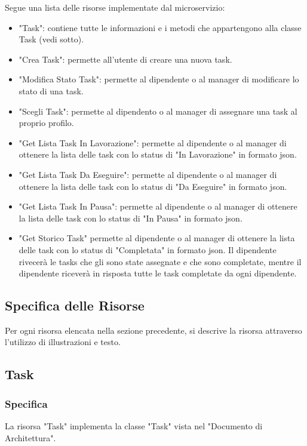 \documentclass{report}
\begin{document}
Segue una lista delle risorse implementate dal microservizio:
\begin{itemize}
	\item "Task": contiene tutte le informazioni e i metodi che appartengono alla classe Task (vedi sotto).
	\item "Crea Task": permette all'utente di creare una nuova task.
	\item "Modifica Stato Task": permette al dipendente o al manager di modificare lo stato di una task.
	\item "Scegli Task": permette al dipendento o al manager di assegnare una task al proprio profilo.
	\item "Get Lista Task In Lavorazione": permette al dipendente o al manager di ottenere la lista delle task con lo status di "In Lavorazione" in formato json.
	\item "Get Lista Task Da Eseguire": permette al dipendente o al manager di ottenere la lista delle task con lo status di "Da Eseguire" in formato json.
	\item "Get Lista Task In Pausa": permette al dipendente o al manager di ottenere la lista delle task con lo status di "In Pausa" in formato json.
	\item "Get Storico Task" permette al dipendente o al manager di ottenere la lista delle task con lo status di "Completata" in formato json. Il dipendente rivecerà le tasks che gli sono state assegnate e che sono completate, mentre il dipendente riceverà in risposta tutte le task completate da ogni dipendente.
\end{itemize}

\subsection{Specifica delle Risorse}

Per ogni risorsa elencata nella sezione precedente, si descrive la risorsa attraverso l'utilizzo di illustrazioni e testo.

\subsection{Task}
\subsubsection*{Specifica}

La risorsa "Task" implementa la classe "Task" vista nel "Documento di Architettura".
\end{document}
